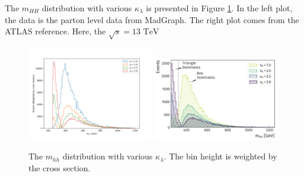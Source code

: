 \documentclass[12pt]{article}
\begin{document}
		The $m_{HH}$ distribution with various $\kappa_\lambda$ is presented in Figure \ref{fig:di-Higgs-SM-kappa-mhh}. In the left plot, the data is the parton level data from MadGraph. The right plot comes from the ATLAS reference. Here, the $\sqrt{s} = \text{13 TeV}$
		\begin{figure}[htpb]
			\centering
			\includegraphics[width=0.49\textwidth]{di-Higgs-SM-kappa-mhh-my-data.png}
			\includegraphics[width=0.49\textwidth]{di-Higgs-SM-kappa-mhh-ref.png}
			\caption{The $m_{hh}$ distribution with various $\kappa_\lambda$. The bin height is weighted by the cross section.}
			\label{fig:di-Higgs-SM-kappa-mhh}
		\end{figure}
\end{document}
